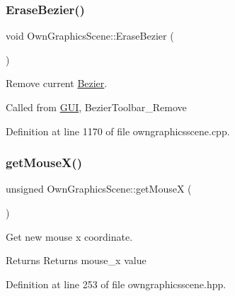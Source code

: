 \mbox{\label{classOwnGraphicsScene_a7b205ba3c4db5e88f60f1f327175b5b6}} 
\subsubsection{\texorpdfstring{Erase\+Bezier()}{EraseBezier()}}
{\footnotesize\ttfamily void Own\+Graphics\+Scene\+::\+Erase\+Bezier (\begin{DoxyParamCaption}{ }\end{DoxyParamCaption})}



Remove current \mbox{\hyperlink{classBezier}{Bezier}}. 

Called from \mbox{\hyperlink{classGUI}{G\+UI}}, Bezier\+Toolbar\+\_\+\+Remove 

Definition at line 1170 of file owngraphicsscene.\+cpp.

\mbox{\label{classOwnGraphicsScene_a6e54bd43db758bcd4f7cc1dd4544232e}} 
\subsubsection{\texorpdfstring{get\+Mouse\+X()}{getMouseX()}}
{\footnotesize\ttfamily unsigned Own\+Graphics\+Scene\+::get\+MouseX (\begin{DoxyParamCaption}{ }\end{DoxyParamCaption})\hspace{0.3cm}{\ttfamily [inline]}}



Get new mouse x coordinate. 

\begin{DoxyReturn}{Returns}
Returns mouse\+\_\+x value 
\end{DoxyReturn}


Definition at line 253 of file owngraphicsscene.\+hpp.

\mbox{\label{classOwnGraphicsScene_a3fd2942e9930fc2dda41844622dc8a35}} 
